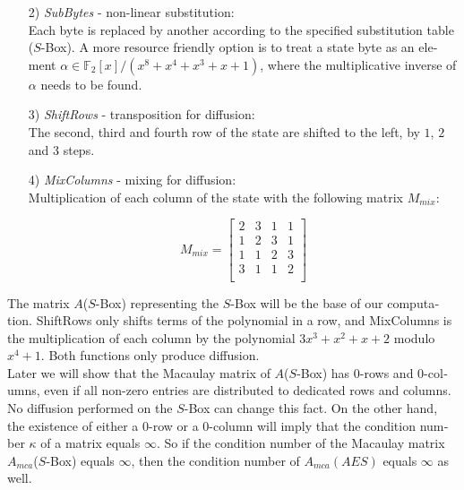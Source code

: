 \documentclass[a4paper,11pt]{article}
\begin{document}
\begin{otherlanguage}{english}
\begin{itemize} [noitemsep, nolistsep]
  \item[2)] \textit{SubBytes} - non-linear substitution: \\
  Each byte is replaced by another according to the specified substitution table ($S$-Box). A more resource friendly option is to treat a state byte as an element $\alpha \in \mathbb{F}_2 [x]/(x^8 + x^4 + x^3 + x + 1)$, where the multiplicative inverse of $\alpha$ needs to be found.
  \vspace{0.1cm}

  \item[3)] \textit{ShiftRows} - transposition for diffusion: \\
  The second, third and fourth row of the state are shifted to the left, by $1$, $2$ and $3$ steps.
  \vspace{0.1cm}

  \item[4)] \textit{MixColumns} - mixing for diffusion: \\
  Multiplication of each column of the state with the following matrix $M_{mix}$:

  $$ 
  	M_{mix} = 
  	\begin{bmatrix}
  		2 & 3 & 1 & 1 \\ 
  	 	1 & 2 & 3 & 1 \\
  	 	1 & 1 & 2 & 3 \\
  	 	3 & 1 & 1 & 2 \\
  	\end{bmatrix}
  $$

\end{itemize} 

\vspace{0.3cm}
\noindent
The matrix $A$($S$-Box) representing the $S$-Box will be the base of our computation. ShiftRows only shifts terms of the polynomial in a row, and MixColumns is the multiplication of each column by the polynomial $3x^{3}+x^{2}+x+2$ modulo $x^4+1$. Both functions only produce diffusion.  \\

\noindent
Later we will show that the Macaulay matrix of $A$($S$-Box) has $0$-rows and $0$-columns, even if all non-zero entries are distributed to dedicated rows and columns. No diffusion performed on the $S$-Box can change this fact. On the other hand, the existence of either a $0$-row or a $0$-column will imply that the condition number $\kappa$ of a matrix equals $\infty$.
So if the condition number of the Macaulay matrix $A_{mca}$($S$-Box) equals $\infty$, then the condition number of $A_{mca}(AES)$ equals $\infty$ as well.



\end{otherlanguage}
\end{document}
